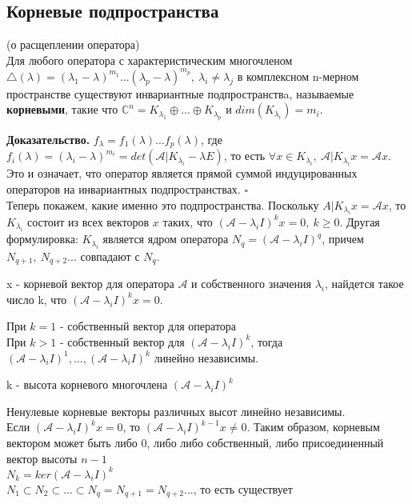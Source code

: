 \subsection{Корневые подпространства}
\begin{theor}\label{raschep}(о расщеплении оператора)\\
Для любого оператора с характеристическим многочленом $\triangle(\lambda)=
(\lambda_1-\lambda)^{m_1}...(\lambda_p-\lambda)^{m_p},~\lambda_i\ne\lambda_j$
в комплексном n-мерном пространстве существуют инвариантные подпространствa,
называемые \textbf{корневыми}, такие что $\mathbb C^n=K_{\lambda_1}\oplus
...\oplus K_{\lambda_p}$ и $dim(K_{\lambda_i})=m_i$.
\end{theor}
\textbf{Доказательство.} $f_\lambda=f_1(\lambda)...f_p(\lambda)$, где $f_i
(\lambda)=(\lambda_i-\lambda)^{m_i}=det(\mathcal A|K_{\lambda_i}-\lambda E)$, 
то есть $\forall x\in K_{\lambda_i},~\mathcal A|K_{\lambda_i}x=\mathcal Ax$.
Это и означает, что оператор является прямой суммой индуцированных операторов
на инвариантных подпространствах. $\square$\\
Теперь покажем, какие именно это подпространства. Поскольку $A|K_{\lambda_i}x
=\mathcal Ax$, то $K_{\lambda_i}$ состоит из всех векторов $x$ таких, что
$(\mathcal A-\lambda_iI)^kx=0,~k\geqslant 0$. Другая формулировка:
$K_{\lambda_i}$ является ядром оператора $N_q=(\mathcal A-\lambda_iI)^q$, 
причем $N_{q+1},~N_{q+2}...$ совпадают с $N_q$. 
\begin{defin}
x - корневой вектор для оператора $\mathcal A$ и собственного значения
$\lambda_i$, найдется такое число k, что $(\mathcal A-\lambda_i I)^kx=0$.
\end{defin}
При $k=1$ - собственный вектор для оператора \\
При $k>1$ - собственный вектор для $(\mathcal A-\lambda_iI)^k$, тогда 
$(\mathcal A-\lambda_iI)^1,...,(\mathcal A-\lambda_iI)^k$ линейно независимы.
\begin{defin}
k - высота корневого многочлена $(\mathcal A-\lambda_iI)^k$
\end{defin}
Ненулевые корневые векторы различных высот линейно независимы.\\
Если $(\mathcal A-\lambda_iI)^kx=0$, то $(\mathcal A-\lambda_iI)^{k-1}x\ne0$.
Таким образом, корневым вектором может быть либо 0, либо либо собственный, 
либо присоединенный вектор высоты $n-1$\\
$N_k=ker(\mathcal A-\lambda_iI)^k$\\
$N_1\subset N_2\subset...\subset N_q=N_{q+1}=N_{q+2}...$, то есть существует 
